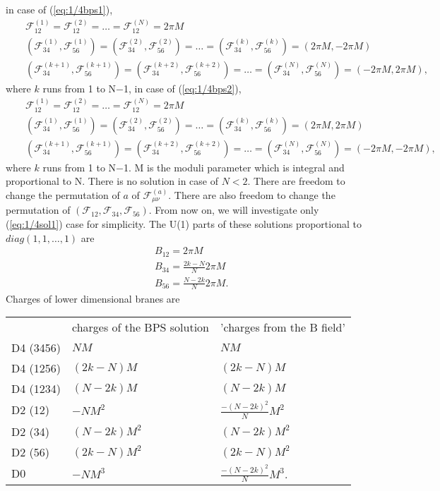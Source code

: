 \documentclass[a4paper,12pt]{article}
\begin{document}
in case of (\ref{eq:1/4bps1}), 
\begin{eqnarray}
&& \mathcal{F}_{12}^{(1)}=\mathcal{F}_{12}^{(2)}= \ldots = \mathcal{F}_{12}^{(N)}=2 \pi M \nonumber \\
&&(\mathcal{F}_{34}^{(1)},\mathcal{F}_{56}^{(1)})=(\mathcal{F}_{34}^{(2)},\mathcal{F}_{56}^{(2)})=\ldots=(\mathcal{F}_{34}^{(k)},\mathcal{F}_{56}^{(k)})=(2 \pi M,-2 \pi M) \nonumber \\
&&(\mathcal{F}_{34}^{(k+1)},\mathcal{F}_{56}^{(k+1)})=(\mathcal{F}_{34}^{(k+2)},\mathcal{F}_{56}^{(k+2)})=\ldots=(\mathcal{F}_{34}^{(N)},\mathcal{F}_{56}^{(N)})=(-2 \pi M,2 \pi M),  \label{eq:1/4sol1}
\end{eqnarray}
where $k$ runs from 1 to N$-$1, in case of (\ref{eq:1/4bps2}), 
\begin{eqnarray}
&& \mathcal{F}_{12}^{(1)}=\mathcal{F}_{12}^{(2)}= \ldots = \mathcal{F}_{12}^{(N)}=2 \pi M \nonumber \\
&&(\mathcal{F}_{34}^{(1)},\mathcal{F}_{56}^{(1)})=(\mathcal{F}_{34}^{(2)},\mathcal{F}_{56}^{(2)})=\ldots=(\mathcal{F}_{34}^{(k)},\mathcal{F}_{56}^{(k)})=(2 \pi M,2 \pi M) \nonumber \\
&&(\mathcal{F}_{34}^{(k+1)},\mathcal{F}_{56}^{(k+1)})=(\mathcal{F}_{34}^{(k+2)},\mathcal{F}_{56}^{(k+2)})=\ldots=(\mathcal{F}_{34}^{(N)},\mathcal{F}_{56}^{(N)})=(-2 \pi M,-2 \pi M),  \label{eq:1/4sol2}
\end{eqnarray}
where $k$ runs from 1 to N$-$1. M is the moduli parameter which is integral and proportional to N. There is no solution in case of $N < 2$. There are freedom to change the permutation of $a$ of $\mathcal{F}_{\mu\nu}^{(a)}$. There are also freedom to change the permutation of $(\mathcal{F}_{12}, \mathcal{F}_{34}, \mathcal{F}_{56} )$. From now on, we will investigate only (\ref{eq:1/4sol1}) case for simplicity. The U(1) parts of these solutions proportional to $diag(1,1,\ldots,1)$ are
\begin{eqnarray}
&&B_{12}=2 \pi M \nonumber \\
&&B_{34}=\frac{2k-N}{N}2 \pi M \nonumber \\
&&B_{56}=\frac{N-2k}{N}2 \pi M. \nonumber 
\end{eqnarray}
Charges of lower dimensional branes are

\begin{tabular}{lll}
          & charges of the BPS solution & 'charges from the B field' \\
D4 (3456) & $NM$ & $NM$ \\
D4 (1256) & $(2k-N)M$ & $(2k-N)M$ \\
D4 (1234) & $(N-2k)M$ & $(N-2k)M$ \\
D2 (12)   & $-NM^2$ & $\frac{-(N-2k)^2}{N}M^2$ \\
D2 (34)   & $(N-2k)M^2$ & $(N-2k)M^2$ \\
D2 (56)   & $(2k-N)M^2$ & $(2k-N)M^2$ \\
D0        & $-NM^3$ & $\frac{-(N-2k)^2}{N}M^3$. \\
\end{tabular}
\end{document}
